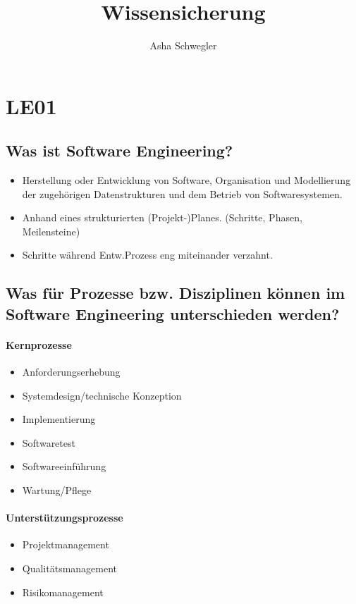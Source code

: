 \documentclass{article}
\title{Wissensicherung}
\author{Asha Schwegler}
\begin{document}
\maketitle

\tableofcontents

\pagebreak

\section{LE01}
\subsection{Was ist Software Engineering?}

\begin{itemize}
 \item Herstellung oder Entwicklung 
von Software,  Organisation und Modellierung der zugehörigen Datenstrukturen und 
dem Betrieb von Softwaresystemen. 
 \item Anhand eines strukturierten (Projekt-)Planes. (Schritte, Phasen, Meilensteine)
 \item Schritte während Entw.Prozess eng miteinander verzahnt.
\end{itemize}

\subsection{Was für Prozesse bzw. Disziplinen können im Software Engineering unterschieden werden?}

\paragraph{Kernprozesse\\}
\begin{itemize}
	\item Anforderungserhebung
	\item Systemdesign/technische Konzeption
	\item Implementierung
	\item Softwaretest
	\item Softwareeinführung
	\item Wartung/Pflege
\end{itemize}

\paragraph{Unterstützungsprozesse\\}
\begin{itemize}
	\item Projektmanagement
	\item Qualitätsmanagement
	\item Risikomanagement
\end{itemize}
\end{document}
